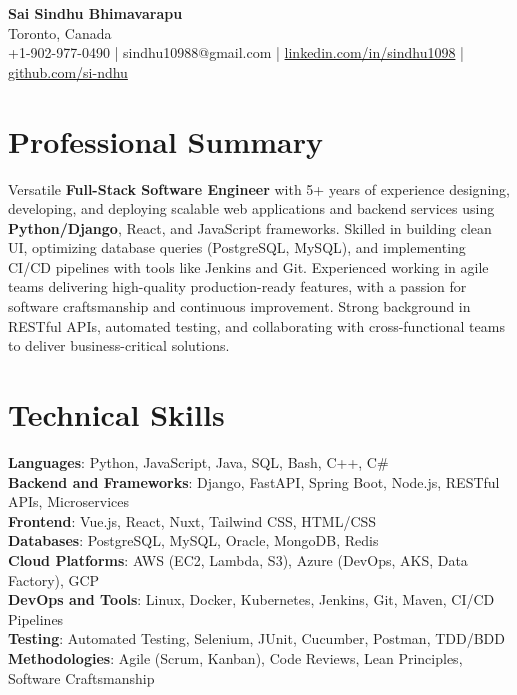 \documentclass[letterpaper,11pt]{article}
\begin{document}
\begin{center}
  {\Large \textbf{Sai Sindhu Bhimavarapu}} \\
  Toronto, Canada \\
  +1-902-977-0490 \enspace | \enspace sindhu10988@gmail.com \enspace | \enspace \href{https://www.linkedin.com/in/sindhu1098/}{linkedin.com/in/sindhu1098} \enspace | \enspace \href{https://github.com/si-ndhu}{github.com/si-ndhu}
\end{center}

\section{Professional Summary}
  \begin{itemize}[leftmargin=0.15in, label={}]
    \small{\item{
     Versatile \textbf{Full-Stack Software Engineer} with 5+ years of experience designing, developing, and deploying scalable web applications and backend services using \textbf{Python/Django}, React, and JavaScript frameworks. Skilled in building clean UI, optimizing database queries (PostgreSQL, MySQL), and implementing CI/CD pipelines with tools like Jenkins and Git. Experienced working in agile teams delivering high-quality production-ready features, with a passion for software craftsmanship and continuous improvement. Strong background in RESTful APIs, automated testing, and collaborating with cross-functional teams to deliver business-critical solutions.
    }}
  \end{itemize}
\vspace{-16pt}

\section{Technical Skills}
 \begin{itemize}[leftmargin=0.15in, label={}]
    \small{\item{
     \textbf{Languages}: Python, JavaScript, Java, SQL, Bash, C++, C\# \\
     \textbf{Backend and Frameworks}: Django, FastAPI, Spring Boot, Node.js, RESTful APIs, Microservices \\
     \textbf{Frontend}: Vue.js, React, Nuxt, Tailwind CSS, HTML/CSS \\
     \textbf{Databases}: PostgreSQL, MySQL, Oracle, MongoDB, Redis \\
     \textbf{Cloud Platforms}: AWS (EC2, Lambda, S3), Azure (DevOps, AKS, Data Factory), GCP \\
     \textbf{DevOps and Tools}: Linux, Docker, Kubernetes, Jenkins, Git, Maven, CI/CD Pipelines \\
     \textbf{Testing}: Automated Testing, Selenium, JUnit, Cucumber, Postman, TDD/BDD \\
     \textbf{Methodologies}: Agile (Scrum, Kanban), Code Reviews, Lean Principles, Software Craftsmanship
    }}
 \end{itemize}
\vspace{-16pt}
\end{document}
